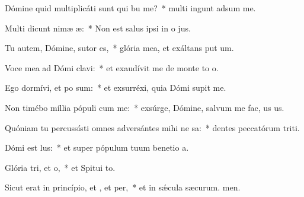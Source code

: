 \item Dómine quid multiplicáti sunt qui bu me?~* multi ingunt adsum me.
\item Multi dicunt nimæ æ:~* Non est salus ipsi in o jus.
\item Tu autem, Dómine, sutor  es,~* glória mea, et exáltans put um.
\item Voce mea ad Dómi clavi:~* et exaudívit me de monte to o.
\item Ego dormívi, et po sum:~* et exsurréxi, quia Dómi supit me.
\item Non timébo míllia pópuli cum me:~* exsúrge, Dómine, salvum me fac, us us.
\item Quóniam tu percussísti omnes adversántes mihi ne sa:~* dentes peccatórum triti.
\item Dómi est lus:~* et super pópulum tuum benetio a.
\item Glória tri, et o,~* et Spitui to.
\item Sicut erat in princípio, et , et per,~* et in sǽcula sæcurum. men.
